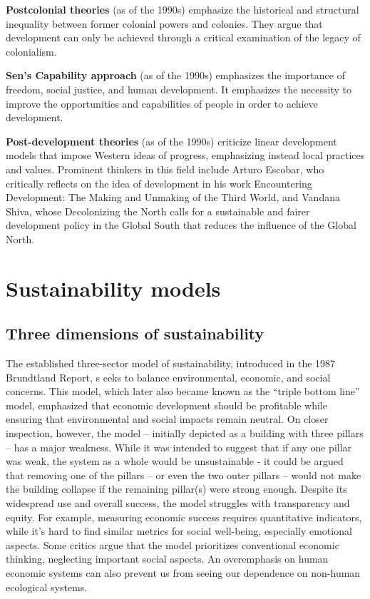 \documentclass[
  a4paper,
  openany]{book}
\begin{document}
\begin{tcolorbox}
\textbf{Postcolonial theories} (as of the 1990s) emphasize the
historical and structural inequality between former colonial powers and
colonies. They argue that development can only be achieved through a
critical examination of the legacy of colonialism.

\textbf{Sen's Capability approach} (as of the 1990s) emphasizes the
importance of freedom, social justice, and human development. It
emphasizes the necessity to improve the opportunities and capabilities
of people in order to achieve development.

\textbf{Post-development theories} (as of the 1990s) criticize linear
development models that impose Western ideas of progress, emphasizing
instead local practices and values. Prominent thinkers in this field
include Arturo Escobar, who critically reflects on the idea of
development in his work Encountering Development: The Making and
Unmaking of the Third World, and Vandana Shiva, whose Decolonizing the
North calls for a sustainable and fairer development policy in the
Global South that reduces the influence of the Global North.

\end{tcolorbox}

\section{Sustainability models}\label{sustainability-models}

\subsection{Three dimensions of
sustainability}\label{three-dimensions-of-sustainability}

The established three-sector model of sustainability, introduced in the
1987 Brundtland Report, s eeks to balance environmental, economic, and
social concerns. This model, which later also became known as the
``triple bottom line'' model, emphasized that economic development
should be profitable while ensuring that environmental and social
impacts remain neutral. On closer inspection, however, the model --
initially depicted as a building with three pillars -- has a major
weakness. While it was intended to suggest that if any one pillar was
weak, the system as a whole would be unsustainable - it could be argued
that removing one of the pillars -- or even the two outer pillars --
would not make the building collapse if the remaining pillar(s) were
strong enough. Despite its widespread use and overall success, the model
struggles with transparency and equity. For example, measuring economic
success requires quantitative indicators, while it's hard to find
similar metrics for social well-being, especially emotional aspects.
Some critics argue that the model prioritizes conventional economic
thinking, neglecting important social aspects. An overemphasis on human
economic systems can also prevent us from seeing our dependence on
non-human ecological systems.
\end{document}
